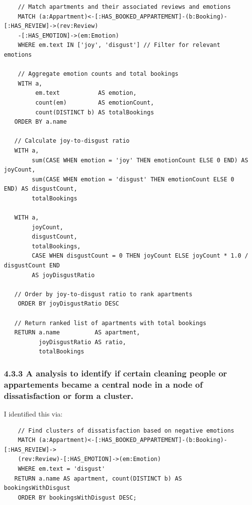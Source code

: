 \documentclass[
]{article}
\begin{document}
\begin{lstlisting}
    // Match apartments and their associated reviews and emotions
    MATCH (a:Appartment)<-[:HAS_BOOKED_APPARTEMENT]-(b:Booking)-[:HAS_REVIEW]->(rev:Review)
    -[:HAS_EMOTION]->(em:Emotion)
    WHERE em.text IN ['joy', 'disgust'] // Filter for relevant emotions

    // Aggregate emotion counts and total bookings 
    WITH a, 
         em.text           AS emotion, 
         count(em)         AS emotionCount, 
         count(DISTINCT b) AS totalBookings
   ORDER BY a.name

   // Calculate joy-to-disgust ratio
   WITH a, 
        sum(CASE WHEN emotion = 'joy' THEN emotionCount ELSE 0 END) AS joyCount,
        sum(CASE WHEN emotion = 'disgust' THEN emotionCount ELSE 0 END) AS disgustCount,
        totalBookings

   WITH a, 
        joyCount,
        disgustCount, 
        totalBookings,
        CASE WHEN disgustCount = 0 THEN joyCount ELSE joyCount * 1.0 / disgustCount END 
        AS joyDisgustRatio

   // Order by joy-to-disgust ratio to rank apartments
    ORDER BY joyDisgustRatio DESC

   // Return ranked list of apartments with total bookings
   RETURN a.name          AS apartment, 
          joyDisgustRatio AS ratio, 
          totalBookings
\end{lstlisting}

\subsubsection{4.3.3 A analysis to identify if certain cleaning people
or appartements became a central node in a node of dissatisfaction or
form a
cluster.}\label{a-analysis-to-identify-if-certain-cleaning-people-or-appartements-became-a-central-node-in-a-node-of-dissatisfaction-or-form-a-cluster.}

I identified this via:
\vspace*{10mm}

\begin{lstlisting}
    // Find clusters of dissatisfaction based on negative emotions
    MATCH (a:Appartment)<-[:HAS_BOOKED_APPARTEMENT]-(b:Booking)-[:HAS_REVIEW]->
    (rev:Review)-[:HAS_EMOTION]->(em:Emotion)
    WHERE em.text = 'disgust'
   RETURN a.name AS apartment, count(DISTINCT b) AS bookingsWithDisgust
    ORDER BY bookingsWithDisgust DESC;
\end{lstlisting}
\end{document}
